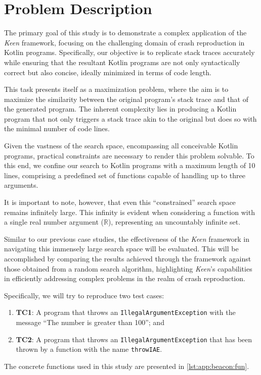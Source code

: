 \section{Problem Description}
\label{sec:beacon:problem}

    The primary goal of this study is to demonstrate a complex application of the \textit{Keen} framework, focusing on 
    the challenging domain of crash reproduction in Kotlin programs. Specifically, our objective is to replicate stack 
    traces accurately while ensuring that the resultant Kotlin programs are not only syntactically correct but also 
    concise, ideally minimized in terms of code length.

    This task presents itself as a maximization problem, where the aim is to maximize the similarity between the 
    original program's stack trace and that of the generated program. The inherent complexity lies in producing a Kotlin
    program that not only triggers a stack trace akin to the original but does so with the minimal number of code lines.

    Given the vastness of the search space, encompassing all conceivable Kotlin programs, practical constraints are 
    necessary to render this problem solvable. To this end, we confine our search to Kotlin programs with a maximum 
    length of 10 lines, comprising a predefined set of functions capable of handling up to three arguments.

    It is important to note, however, that even this \enquote{constrained} search space remains infinitely large. This 
    infinity is evident when considering a function with a single real number argument (\(\mathbb{R}\)), representing 
    an uncountably infinite set. 

    Similar to our previous case studies, the effectiveness of the \textit{Keen} framework in navigating this 
    immensely large search space will be evaluated. This will be accomplished by comparing the results achieved 
    through the framework against those obtained from a random search algorithm, highlighting \textit{Keen}'s 
    capabilities in efficiently addressing complex problems in the realm of crash reproduction.

    Specifically, we will try to reproduce two test cases:

    \begin{enumerate}
        \item \textbf{TC1}: A program that throws an \texttt{IllegalArgumentException} with the message \enquote{The 
            number is greater than 100}; and
        \item \textbf{TC2}: A program that throws an \texttt{IllegalArgumentException} that has been thrown by a 
            function with the name \texttt{throwIAE}.
    \end{enumerate}
    
    The concrete functions used in this study are presented in \vref{lst:app:beacon:fun}.
